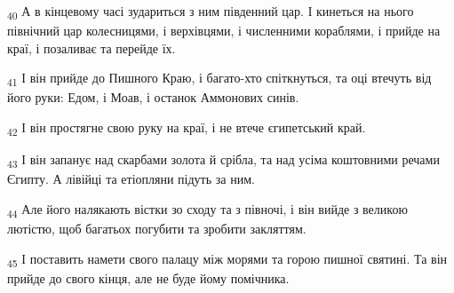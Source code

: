 \begin{tcolorbox}
\textsubscript{40} А в кінцевому часі зудариться з ним південний цар. І кинеться на нього північний цар колесницями, і верхівцями, і численними кораблями, і прийде на краї, і позаливає та перейде їх.
\end{tcolorbox}
\begin{tcolorbox}
\textsubscript{41} І він прийде до Пишного Краю, і багато-хто спіткнуться, та оці втечуть від його руки: Едом, і Моав, і останок Аммонових синів.
\end{tcolorbox}
\begin{tcolorbox}
\textsubscript{42} І він простягне свою руку на краї, і не втече єгипетський край.
\end{tcolorbox}
\begin{tcolorbox}
\textsubscript{43} І він запанує над скарбами золота й срібла, та над усіма коштовними речами Єгипту. А лівійці та етіопляни підуть за ним.
\end{tcolorbox}
\begin{tcolorbox}
\textsubscript{44} Але його налякають вістки зо сходу та з півночі, і він вийде з великою лютістю, щоб багатьох погубити та зробити закляттям.
\end{tcolorbox}
\begin{tcolorbox}
\textsubscript{45} І поставить намети свого палацу між морями та горою пишної святині. Та він прийде до свого кінця, але не буде йому помічника.
\end{tcolorbox}
